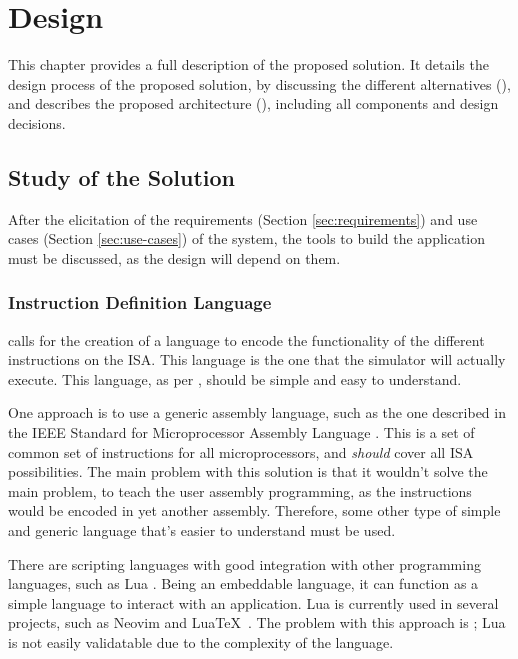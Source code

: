 \chapter{Design}\label{chap:design}
This chapter provides a full description of the proposed solution. It details the design process of the proposed solution, by discussing the different alternatives (), and describes the proposed architecture (), including all components and design decisions.


\section{Study of the Solution}\label{sec:study}  %
After the elicitation of the requirements (Section \ref{sec:requirements}) and use cases (Section \ref{sec:use-cases}) of the system, the tools to build the application must be discussed, as the design will depend on them.


\subsection{Instruction Definition Language}\label{subsec:inst-lang-study}
 calls for the creation of a language to encode the functionality of the different \glspl{instruction} on the \gls{ISA}. This language is the one that the simulator will actually execute. This language, as per , should be simple and easy to understand.

One approach is to use a generic assembly language, such as the one described in the IEEE Standard for Microprocessor Assembly Language \parencite{IEEE-694-1985}. This is a set of common set of \glspl{instruction} for all microprocessors, and \textit{should} cover all \gls{ISA} possibilities. The main problem with this solution is that it wouldn't solve the main problem, to teach the user \gls{assembly} programming, as the \glspl{instruction} would be encoded in yet another \gls{assembly}. Therefore, some other type of simple and generic language that's easier to understand must be used.

There are scripting languages with good integration with other programming languages, such as Lua \parencite{lua}. Being an embeddable language, it can function as a simple language to interact with an application. Lua is currently used in several projects, such as Neovim \parencite{nvim-lua} and Lua\TeX~\parencite{luatex}. The problem with this approach is ; Lua is not easily validatable due to the complexity of the language. 

